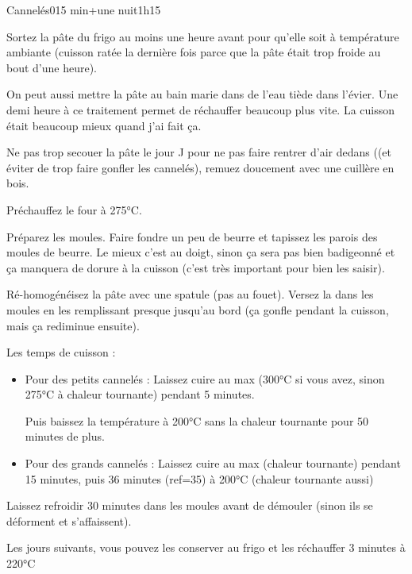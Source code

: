 {\begin{recette}{Cannelés}{0}{15 min+une nuit}{1h15}
\begin{cuisson}
Sortez la pâte du frigo au moins une heure avant pour qu'elle soit à température ambiante (cuisson ratée la dernière fois parce que la pâte était trop froide au bout d'une heure). 

\begin{remarque}
 On peut aussi mettre la pâte au bain marie dans de l'eau tiède dans l'évier. Une demi heure à ce traitement permet de réchauffer beaucoup plus vite. La cuisson était beaucoup mieux quand j'ai fait ça.
\end{remarque}


Ne pas trop secouer la pâte le jour J pour ne pas faire rentrer d'air dedans ((et éviter de trop faire gonfler les cannelés), remuez doucement avec une cuillère en bois.

Préchauffez le four à 275°C. 

Préparez les moules. Faire fondre un peu de beurre et tapissez les parois des moules de beurre. Le mieux c'est au 
doigt, sinon ça sera pas bien badigeonné et ça manquera de dorure à la cuisson (c'est très important pour bien les saisir).

Ré-homogénéisez la pâte avec une spatule (pas au fouet). Versez la dans les moules en les remplissant presque jusqu'au bord (ça gonfle pendant la cuisson, mais ça rediminue ensuite). 

Les temps de cuisson : 
\begin{itemize}
\item Pour des petits cannelés : 
Laissez cuire au max (300°C si vous avez, sinon 275°C à chaleur tournante) pendant 5 minutes. 

Puis baissez la température à 200°C sans la chaleur tournante pour 50 minutes de plus. 

\item Pour des grands cannelés : 
Laissez cuire au max (chaleur tournante) pendant 15 minutes, puis 36 minutes (ref=35) à 200°C (chaleur tournante aussi)
\end{itemize}

Laissez refroidir 30 minutes dans les moules avant de démouler (sinon ils se déforment et s'affaissent).
\end{cuisson}
\begin{remarque}
Les jours suivants, vous pouvez les conserver au frigo et les réchauffer 3 minutes à 220°C
\end{remarque}
\end{recette}



}
